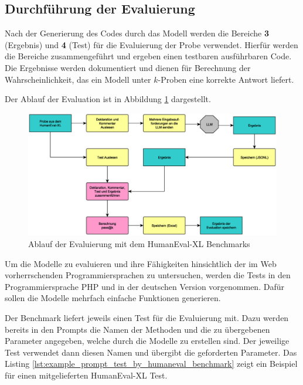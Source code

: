 \subsection{Durchführung der Evaluierung}
Nach der Generierung des Codes durch das Modell werden die Bereiche \textbf{3} (Ergebnis) und \textbf{4} (Test) für die Evaluierung der Probe verwendet. Hierfür werden die Bereiche zusammengeführt und ergeben einen testbaren ausführbaren Code. Die Ergebnisse werden dokumentiert und dienen für Berechnung der Wahrscheinlichkeit, das ein Modell unter $k$-Proben eine korrekte Antwort liefert.\vspace{0.2cm}

Der Ablauf der Evaluation ist in Abbildung \ref{img:sequence_of_evaluation} dargestellt.\vspace{0.2cm}

\begin{figure}[!ht]
	\includegraphics[width=\textwidth]{content/chapter_concept_design/images/ablauf_evaluation.eps}
	\centering
	\caption{Ablauf der Evaluierung mit dem HumanEval-XL Benchmarks}
	\label{img:sequence_of_evaluation}
\end{figure}

Um die Modelle zu evaluieren und ihre Fähigkeiten hinsichtlich der im Web vorherrschenden Programmiersprachen zu untersuchen, werden die Tests in den Programmiersprache PHP und in der deutschen Version vorgenommen. Dafür sollen die Modelle mehrfach einfache Funktionen generieren.\vspace{0.2cm}

Der Benchmark liefert jeweils einen Test für die Evaluierung mit. Dazu werden bereits in den Prompts die Namen der Methoden und die zu übergebenen Parameter angegeben, welche durch die Modelle zu erstellen sind. Der jeweilige Test verwendet dann diesen Namen und übergibt die geforderten Parameter. Das Listing \ref{lst:example_prompt_test_by_humaneval_benchmark} zeigt ein Beispiel für einen mitgelieferten HumanEval-XL Test.\vspace{0.2cm}

